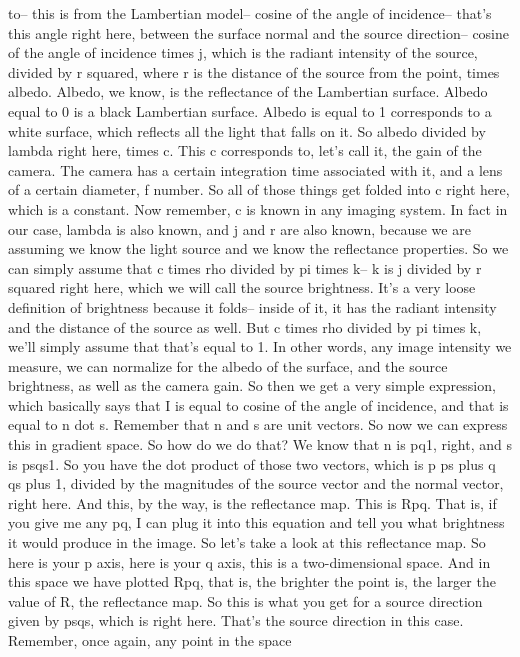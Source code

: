 \documentclass[12pt]{article}
\begin{document}
to-- this is from the Lambertian model--
cosine of the angle of incidence--
that's this angle right here, between the surface
normal and the source direction-- cosine of the angle
of incidence times j, which is the radiant intensity
of the source, divided by r squared,
where r is the distance of the source from the point,
times albedo.
Albedo, we know, is the reflectance
of the Lambertian surface.
Albedo equal to 0 is a black Lambertian surface.
Albedo is equal to 1 corresponds to a white surface, which
reflects all the light that falls on it.
So albedo divided by lambda right here, times c.
This c corresponds to, let's call
it, the gain of the camera.
The camera has a certain integration time
associated with it, and a lens of a certain diameter,
f number.
So all of those things get folded
into c right here, which is a constant.
Now remember, c is known in any imaging system.
In fact in our case, lambda is also known,
and j and r are also known, because we are assuming we
know the light source and we know
the reflectance properties.
So we can simply assume that c times rho divided
by pi times k-- k is j divided by r squared right here, which
we will call the source brightness.
It's a very loose definition of brightness because it folds--
inside of it, it has the radiant intensity and the distance
of the source as well.
But c times rho divided by pi times k,
we'll simply assume that that's equal to 1.
In other words, any image intensity we measure,
we can normalize for the albedo of the surface,
and the source brightness, as well as the camera gain.
So then we get a very simple expression, which basically
says that I is equal to cosine of the angle of incidence,
and that is equal to n dot s.
Remember that n and s are unit vectors.
So now we can express this in gradient space.
So how do we do that?
We know that n is pq1, right, and s is psqs1.
So you have the dot product of those two vectors, which
is p ps plus q qs plus 1, divided
by the magnitudes of the source vector and the normal vector,
right here.
And this, by the way, is the reflectance map.
This is Rpq.
That is, if you give me any pq, I
can plug it into this equation and tell you
what brightness it would produce in the image.
So let's take a look at this reflectance map.
So here is your p axis, here is your q axis,
this is a two-dimensional space.
And in this space we have plotted Rpq,
that is, the brighter the point is, the larger
the value of R, the reflectance map.
So this is what you get for a source direction
given by psqs, which is right here.
That's the source direction in this case.
Remember, once again, any point in the space
\end{document}
